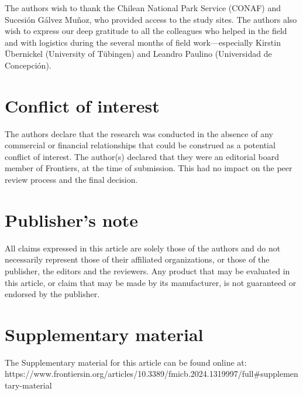 The authors wish to thank the Chilean National Park Service (CONAF) and Sucesión Gálvez Muñoz, who provided access to the study sites. The authors also wish to express our deep gratitude to all the colleagues who helped in the field and with logistics during the several months of field work—especially Kirstin Übernickel (University of Tübingen) and Leandro Paulino (Universidad de Concepción).

\section*{Conflict of interest}

The authors declare that the research was conducted in the absence of any commercial or financial relationships that could be construed as a potential conflict of interest. The author(s) declared that they were an editorial board member of Frontiers, at the time of submission. This had no impact on the peer review process and the final decision.

\section*{Publisher's note}

All claims expressed in this article are solely those of the authors and do not necessarily represent those of their affiliated organizations, or those of the publisher, the editors and the reviewers. Any product that may be evaluated in this article, or claim that may be made by its manufacturer, is not guaranteed or endorsed by the publisher.

\section*{Supplementary material}

The Supplementary material for this article can be found online at: https://www.frontiersin.org/articles/10.3389/fmicb.2024.1319997/full#supplementary-material


